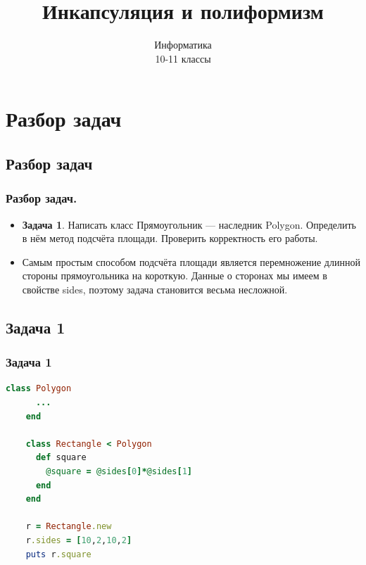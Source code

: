\documentclass[compress,red]{beamer}
\title{Инкапсуляция и полиформизм}
\author{Информатика \\ 10-11 классы}
\begin{document}
\maketitle

\section{Разбор задач}

\subsection{Разбор задач}
\begin{frame}
  \frametitle{Разбор задач.}
  \begin{itemize}
    \item \textbf{Задача 1}. Написать класс Прямоугольник --- наследник Polygon. Определить в нём метод подсчёта площади. Проверить корректность его работы.
    \item Самым простым способом подсчёта площади является перемножение длинной стороны прямоугольника на короткую. Данные о сторонах мы имеем в свойстве sides, поэтому задача становится весьма несложной.
  \end{itemize}
\end{frame}

\subsection{Задача 1}
\begin{frame}[fragile]
  \frametitle{Задача 1}
  \scriptsize{
  \begin{lstlisting}[language=ruby,basicstyle=\footnotesize,label=ruby1,caption=Задача 1]
    class Polygon
      ...
    end
    
    class Rectangle < Polygon
      def square
        @square = @sides[0]*@sides[1]
      end
    end
    
    r = Rectangle.new
    r.sides = [10,2,10,2]
    puts r.square
  \end{lstlisting}
  }
  
\end{frame}
\end{document}
